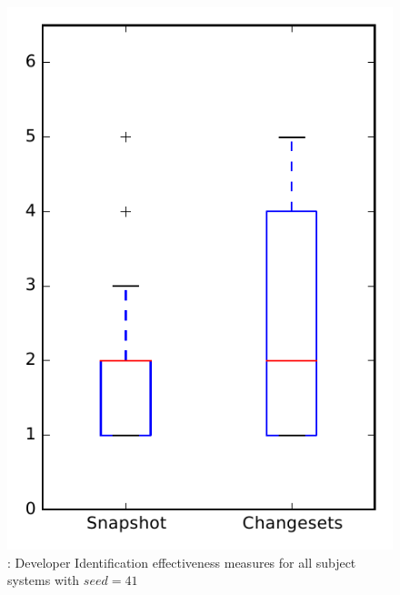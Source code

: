 
\begin{figure}
\centering
\includegraphics[height=0.4\textheight]{figures/dit_seed/rq1_overview_41}
\caption{\rtwo: Developer Identification effectiveness measures for all subject systems with $seed=41$}
\label{fig:dit_seed:rq1:overview}
\end{figure}
